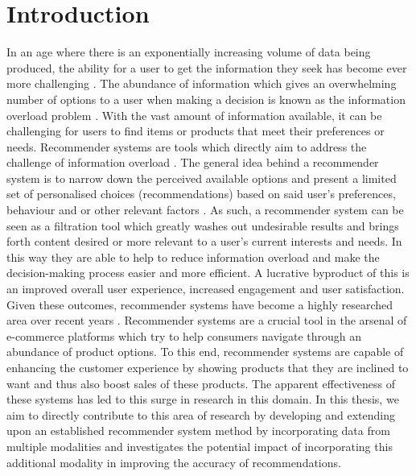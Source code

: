 
\chapter{Introduction} %

\label{Chapter1} %


\newcommand{\keyword}[1]{\textbf{#1}}
\newcommand{\tabhead}[1]{\textbf{#1}}
\newcommand{\code}[1]{\texttt{#1}}
\newcommand{\file}[1]{\texttt{\bfseries#1}}
\newcommand{\option}[1]{\texttt{\itshape#1}}



In an age where there is an exponentially increasing volume of data being produced, the ability for a user to get the information they seek has become ever more challenging \cite{sintef2013bigdata}. The abundance of information which gives an overwhelming number of options to a user when making a decision is known as the information overload problem \cite{bawden2020information}. With the vast amount of information available, it can be challenging for users to find items or products that meet their preferences or needs. Recommender systems are tools which directly aim to address the challenge of information overload \cite{o2005trust}. The general idea behind a recommender system is to narrow down the perceived available options and present a limited set of personalised choices (recommendations) based on said user’s preferences, behaviour and or other relevant factors \cite{o2005trust}. As such, a recommender system can be seen as a filtration tool which greatly washes out undesirable results and brings forth content desired or more relevant to a user’s current interests and needs. In this way they are able to help to reduce information overload and make the decision-making process easier and more efficient. A lucrative byproduct of this is an improved overall user experience, increased engagement and user satisfaction. Given these outcomes, recommender systems have become a highly researched area over recent years \cite{seth2022comparative}. Recommender systems are a crucial tool in the arsenal of e-commerce platforms which try to help consumers navigate through an abundance of product options. To this end, recommender systems are capable of enhancing the customer experience by showing products that they are inclined to want and thus also boost sales of these products. The apparent effectiveness of these systems has led to this surge in research in this domain. In this thesis, we aim to directly contribute to this area of research by developing and extending upon an established recommender system method by incorporating data from multiple modalities and investigates the potential impact of incorporating this additional modality in improving the accuracy of recommendations. 

